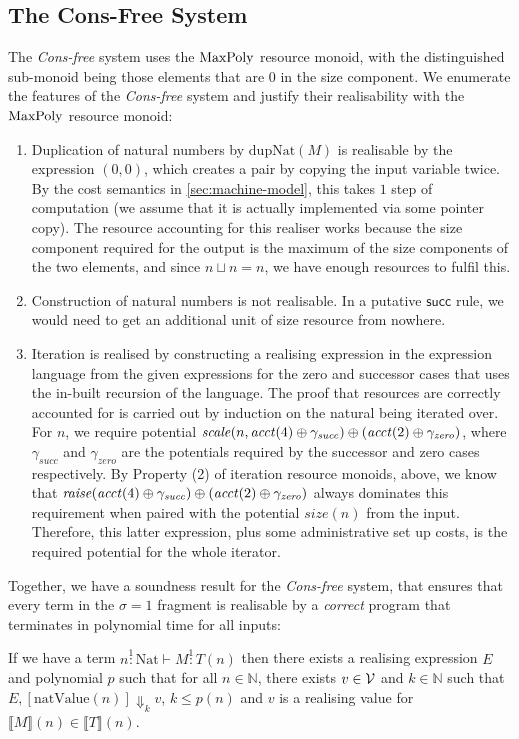 \documentclass[acmsmall,screen]{acmart}
\newcommand{\tyNat}{\mathrm{Nat}}
\newcommand{\conSucc}{\mathsf{succ}}
\newcommand{\dupNat}{\mathrm{dupNat}}
\newcommand{\ConsFree}{\emph{Cons-free}}
\begin{document}
\subsection{The Cons-Free System}
\label{sec:consfree-sound}

The \ConsFree{} system uses the $\mathrm{MaxPoly}$ resource monoid, with
the distinguished sub-monoid being those elements that are $0$ in the
size component. We enumerate the features of the \ConsFree{}
system and justify their realisability with the $\mathrm{MaxPoly}$ resource
monoid:
\begin{enumerate}
\item Duplication of natural numbers by $\dupNat(M)$ is realisable by
  the expression $(0,0)$, which creates a pair by copying the input
  variable twice. By the cost semantics in
  \autoref{sec:machine-model}, this takes $1$ step of computation (we
  assume that it is actually implemented via some pointer copy).  The
  resource accounting for this realiser works because the size
  component required for the output is the maximum of the size
  components of the two elements, and since $n \sqcup n = n$, we have
  enough resources to fulfil this.
\item Construction of natural numbers is not realisable. In a putative
  $\conSucc$ rule, we would need to get an additional unit of size
  resource from nowhere.
\item Iteration is realised by constructing a realising expression in
  the expression language from the given expressions for the zero and
  successor cases that uses the in-built recursion of the
  language. The proof that resources are correctly accounted for is
  carried out by induction on the natural being iterated over. For
  $n$, we require potential
  $\mathit{scale}(n,\mathit{acct}(4) \oplus \gamma_{\mathit{succ}})
  \oplus (\mathit{acct}(2) \oplus \gamma_{\mathit{zero}})$, where
  $\gamma_{\mathit{succ}}$ and $\gamma_{\mathit{zero}}$ are the
  potentials required by the successor and zero cases respectively. By
  Property (2) of iteration resource monoids, above, we know that
  $\mathit{raise}(\mathit{acct}(4) \oplus \gamma_{\mathit{succ}})
  \oplus (\mathit{acct}(2) \oplus \gamma_{\mathit{zero}})$ always
  dominates this requirement when paired with the potential
  $\mathit{size}(n)$ from the input. Therefore, this latter
  expression, plus some administrative set up costs, is the required
  potential for the whole iterator.
\end{enumerate}
Together, we have a soundness result for the \ConsFree{} system,
that ensures that every term in the $\sigma = 1$ fragment is
realisable by a \emph{correct} program that terminates in polynomial
time for all inputs:
\begin{theorem}[Soundness for the \ConsFree{} System]
  \label{thm:cons-free-soundness}
  If we have a term $n \stackrel1: \tyNat \vdash M \stackrel1: T(n)$ then there
  exists a realising expression $E$ and polynomial $p$ such that for
  all $n \in \mathbb{N}$, there exists $v \in \mathcal{V}$ and
  $k \in \mathbb{N}$ such that
  $E, [\mathrm{natValue}(n)] \Downarrow_k v$, $k \leq p(n)$ and $v$ is
  a realising value for
  $\llbracket M \rrbracket(n) \in \llbracket T \rrbracket(n)$.
\end{theorem}
\end{document}
